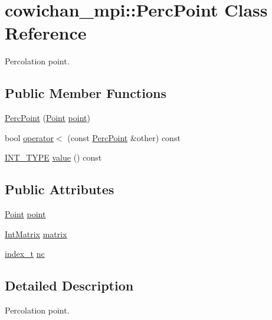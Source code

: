 \hypertarget{classcowichan__mpi_1_1_perc_point}{
\section{cowichan\_\-mpi::PercPoint Class Reference}
\label{classcowichan__mpi_1_1_perc_point}
}
Percolation point.  


\subsection*{Public Member Functions}
\begin{CompactItemize}
\item 
\hyperlink{classcowichan__mpi_1_1_perc_point_e2110cb8b13c9e1533a7e02dc40c5184}{PercPoint} (\hyperlink{class_point}{Point} \hyperlink{classcowichan__mpi_1_1_perc_point_2511cf8b976a0a1a0049eaf36848fd32}{point})
\item 
bool \hyperlink{classcowichan__mpi_1_1_perc_point_b3a2db92dee14afdf3e9506251fdb162}{operator$<$} (const \hyperlink{classcowichan__mpi_1_1_perc_point}{PercPoint} \&other) const 
\item 
\hyperlink{cowichan_8hpp_c96945095fd0ce7186a1d00a89f77d2c}{INT\_\-TYPE} \hyperlink{classcowichan__mpi_1_1_perc_point_aa17cfbf6f592c70921c009cd735056c}{value} () const 
\end{CompactItemize}
\subsection*{Public Attributes}
\begin{CompactItemize}
\item 
\hyperlink{class_point}{Point} \hyperlink{classcowichan__mpi_1_1_perc_point_2511cf8b976a0a1a0049eaf36848fd32}{point}
\item 
\hyperlink{cowichan_8hpp_82321152ddeeefe9c61350a42ed9e7af}{IntMatrix} \hyperlink{classcowichan__mpi_1_1_perc_point_0469972f0ba029e73a95744af5b1cb79}{matrix}
\item 
\hyperlink{cowichan_8hpp_5b04577d5d21124855deaad298595371}{index\_\-t} \hyperlink{classcowichan__mpi_1_1_perc_point_f6ef42cb2b4cc4598766150abf60d6b9}{nc}
\end{CompactItemize}


\subsection{Detailed Description}
Percolation point. 

